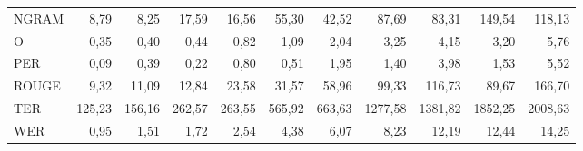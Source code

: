 \documentclass[11pt,a4paper]{article}
\begin{document}
\begin{table}[H]
{\begin{tabular}{l r r | r r | r r | r r | r r }
NGRAM  & 8,79          & 8,25         & 17,59         & 16,56         & 55,30         & 42,52         & 87,69          & 83,31         & 149,54         & 118,13        \\
O      & 0,35          & 0,40         & 0,44          & 0,82          & 1,09          & 2,04          & 3,25           & 4,15          & 3,20           & 5,76          \\
PER    & 0,09          & 0,39         & 0,22          & 0,80          & 0,51          & 1,95          & 1,40           & 3,98          & 1,53           & 5,52          \\
ROUGE  & 9,32          & 11,09        & 12,84         & 23,58         & 31,57         & 58,96         & 99,33          & 116,73        & 89,67          & 166,70        \\
TER    & 125,23        & 156,16       & 262,57        & 263,55        & 565,92        & 663,63        & 1277,58        & 1381,82       & 1852,25        & 2008,63       \\
WER    & 0,95          & 1,51         & 1,72          & 2,54          & 4,38          & 6,07          & 8,23           & 12,19         & 12,44          & 14,25        \\ \hline
\end{tabular}}
\label{table:Ex1-ws_corpus200}
\normalsize
\end{table}
\end{document}
